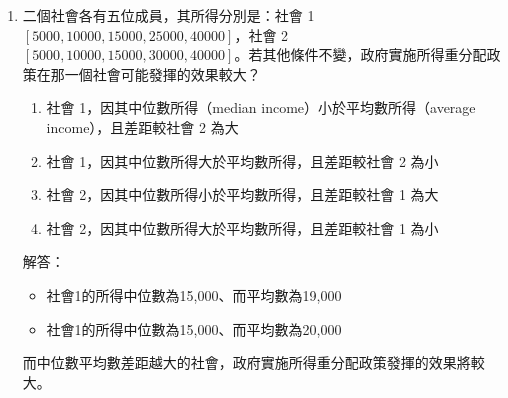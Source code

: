\documentclass[12pt, a4paper]{article}
\begin{document}
\begin{enumerate}
    \item 二個社會各有五位成員，其所得分別是：社會 1 \([5000, 10000, 15000, 25000, 40000]\)，社會 2 \([5000, 10000, 15000, 30000, 40000]\)。若其他條件不變，政府實施所得重分配政策在那一個社會可能發揮的效果較大？
    \begin{enumerate}[label=\Alph*.]
        \item 社會 1，因其中位數所得（median income）小於平均數所得（average income），且差距較社會 2 為大
        \item 社會 1，因其中位數所得大於平均數所得，且差距較社會 2 為小
        \item 社會 2，因其中位數所得小於平均數所得，且差距較社會 1 為大
        \item 社會 2，因其中位數所得大於平均數所得，且差距較社會 1 為小
    \end{enumerate}
    解答：
    \begin{itemize}
        \item 社會1的所得中位數為15,000、而平均數為19,000
        \item 社會1的所得中位數為15,000、而平均數為20,000
    \end{itemize}
    而中位數平均數差距越大的社會，政府實施所得重分配政策發揮的效果將較大。

\end{enumerate}
\end{document}
